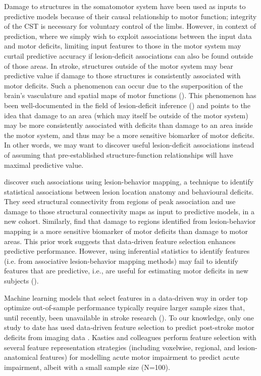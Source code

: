 \documentclass[10pt]{article}
\begin{document}
Damage to structures in the somatomotor system have been used as inputs to predictive models because of their causal relationship to motor function; integrity of the CST is necessary for voluntary control of the limbs. However, in context of prediction, where we simply wish to exploit associations between the input data and motor deficits, limiting input features to those in the motor system may curtail predictive accuracy if lesion-deficit associations can also be found outside of those areas. In stroke, structures outside of the motor system may bear predictive value if damage to those structures is consistently associated with motor deficits. Such a phenomenon can occur due to the superposition of the brain's vasculature and spatial maps of motor functions (\cite{Mah2014-cb, Sperber2020-kp,Kasties2021-rm, Calesella2021-kp}). This phenomenon has been well-documented in the field of lesion-deficit inference
(\cite{Mah2014-cb, Sperber2020-kp,Kasties2021-rm, Calesella2021-kp}) and points to the idea that damage to an area (which may itself be outside of the motor system) may be more consistently associated with deficits than damage to an area inside the motor system, and thus may be a more sensitive biomarker of motor deficits. In other words, we may want to  discover useful lesion-deficit associations instead of assuming that pre-established structure-function relationships will have maximal predictive value.

\cite{Bowren2022-rs} discover such associations using lesion-behavior mapping, a technique to identify statistical associations between lesion location anatomy and behavioural deficits. They seed structural connectivity from regions of peak association and use damage to those structural connectivity maps as input to predictive models, in a new cohort. Similarly, \cite{Sperber2021-lw} find that damage to regions identified from lesion-behavior mapping is a more sensitive biomarker of motor deficits than damage to motor areas. This prior work suggests that data-driven feature selection enhances predictive performance. However, using inferential statistics to identify features (i.e. from associative lesion-behavior mapping methods) may fail to identify features that are predictive, i.e., are useful for estimating motor deficits in new subjects (\cite{Bzdok2020-py}).

Machine learning models that select features in a data-driven way in order top optimize out-of-sample performance typically require larger sample sizes that, until recently, been unavailable in stroke research (\cite{Bzdok2020-py}). To our knowledge, only one study to date has used data-driven feature selection to predict post-stroke motor deficits from imaging data \cite{Kasties2021-rm}. Kasties and colleagues perform feature selection with several feature representation strategies (including voxelwise, regional, and lesion-anatomical features) for modelling acute motor impairment to predict acute impairment, albeit with a small sample size (N=100). 
\end{document}
